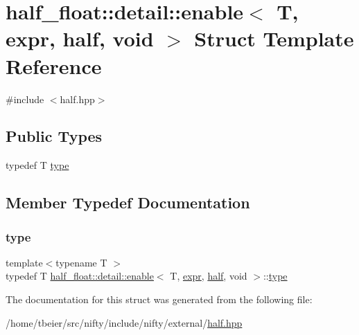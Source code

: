 \hypertarget{structhalf__float_1_1detail_1_1enable_3_01T_00_01expr_00_01half_00_01void_01_4}{}\section{half\+\_\+float\+:\+:detail\+:\+:enable$<$ T, expr, half, void $>$ Struct Template Reference}
\label{structhalf__float_1_1detail_1_1enable_3_01T_00_01expr_00_01half_00_01void_01_4}


{\ttfamily \#include $<$half.\+hpp$>$}

\subsection*{Public Types}
\begin{DoxyCompactItemize}
\item 
typedef T \hyperlink{structhalf__float_1_1detail_1_1enable_3_01T_00_01expr_00_01half_00_01void_01_4_a40f8fe0ca6c2b5ec34d68b539ac0d399}{type}
\end{DoxyCompactItemize}


\subsection{Member Typedef Documentation}
\mbox{\label{structhalf__float_1_1detail_1_1enable_3_01T_00_01expr_00_01half_00_01void_01_4_a40f8fe0ca6c2b5ec34d68b539ac0d399}} 
\subsubsection{\texorpdfstring{type}{type}}
{\footnotesize\ttfamily template$<$typename T $>$ \\
typedef T \hyperlink{structhalf__float_1_1detail_1_1enable}{half\+\_\+float\+::detail\+::enable}$<$ T, \hyperlink{structhalf__float_1_1detail_1_1expr}{expr}, \hyperlink{classhalf__float_1_1half}{half}, void $>$\+::\hyperlink{structhalf__float_1_1detail_1_1enable_3_01T_00_01expr_00_01half_00_01void_01_4_a40f8fe0ca6c2b5ec34d68b539ac0d399}{type}}



The documentation for this struct was generated from the following file\+:\begin{DoxyCompactItemize}
\item 
/home/tbeier/src/nifty/include/nifty/external/\hyperlink{half_8hpp}{half.\+hpp}\end{DoxyCompactItemize}

